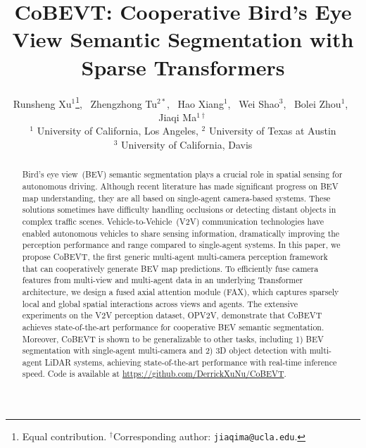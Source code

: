 \documentclass{article}
\title{CoBEVT: Cooperative Bird's Eye View Semantic Segmentation with Sparse Transformers}
\author{Runsheng Xu$^1$\thanks{Equal contribution. $^\dagger$Corresponding author: \texttt{jiaqima@ucla.edu}.},~
Zhengzhong Tu$^{2*}$,~
Hao Xiang$^{1}$,~
Wei Shao$^{3}$,~
Bolei Zhou$^{1}$,~
Jiaqi Ma$^{1\dagger}$ \\
$^1$ University of California, Los Angeles,
$^2$ University of Texas at Austin \\
$^3$ University of California, Davis
}
\begin{document}
\maketitle

\begin{abstract}
    Bird’s eye view~(BEV) semantic segmentation plays a crucial role in spatial sensing for autonomous driving.
    Although recent literature has made significant progress on BEV map understanding, they are all based on single-agent camera-based systems.
    These solutions sometimes have difficulty handling occlusions or detecting distant objects in complex traffic scenes.
   Vehicle-to-Vehicle~(V2V) communication technologies have enabled autonomous vehicles to share sensing information, dramatically improving the perception performance and range compared to single-agent systems.
    In this paper, we propose CoBEVT, the first generic multi-agent multi-camera perception framework that can cooperatively generate BEV map predictions. %
    To efficiently fuse camera features from multi-view and multi-agent data in an underlying Transformer architecture, we design a fused axial attention module (FAX), which captures sparsely local and global spatial interactions across views and agents.
    The extensive experiments on the V2V perception dataset, OPV2V, demonstrate that CoBEVT achieves state-of-the-art performance for cooperative BEV semantic segmentation.
    Moreover, CoBEVT is shown to be generalizable to other tasks, including 1) BEV segmentation with single-agent multi-camera and 2) 3D object detection with multi-agent LiDAR systems, achieving state-of-the-art performance with real-time inference speed.
    Code is available at \url{https://github.com/DerrickXuNu/CoBEVT}.
\end{abstract}


\end{document}

